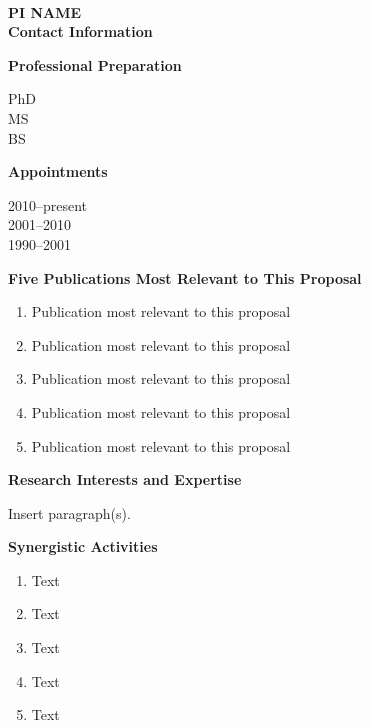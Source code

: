 \documentclass[11pt,letterpaper,english]{article}
\begin{document}
\setlength{\parindent}{0in} %

\pagestyle{fancy}   \renewcommand{%
\headrulewidth}{0.0pt}



\\
{\bf PI NAME}\\
{\bf Contact Information} \smallskip

\begin{flushleft} {\bf Professional Preparation}
{\parindent 16pt

PhD \\ 
MS \\ 
BS \\ 
}

\vspace{.04in}
{\bf Appointments}
{\parindent 16pt

2010--present \\ 
2001--2010 \\ 
1990--2001 \\ 
}

\vspace{.04in}
{\bf Five Publications Most Relevant to This Proposal}
\vspace{-6pt}
\begin{enumerate} \itemsep1pt \parskip0pt 
\item Publication most relevant to this proposal \\ 
\item Publication most relevant to this proposal \\ 
\item Publication most relevant to this proposal \\ 
\item Publication most relevant to this proposal \\ 
\item Publication most relevant to this proposal \\ 
\end{enumerate} 

\vspace{-6pt}
{\bf Research Interests and Expertise}
{\parindent 16pt

Insert paragraph(s).
}

\vspace{.04in}
{\bf Synergistic Activities}
\vspace{-6pt}
\begin{enumerate} \itemsep1pt \parskip0pt 
\item Text \\ 
\item Text \\ 
\item Text \\ 
\item Text \\ 
\item Text \\ 
\end{enumerate} 


\end{flushleft}
\end{document}
